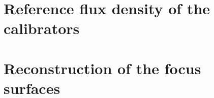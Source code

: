 \documentclass{aa}
\begin{document}
 
\begin{acknowledgements}
     
\end{acknowledgements}

%
%

\begin{appendix}
  \section{Reference flux density of the calibrators}
  \label{se:ref_flux_calibrator}
  
  
  \section{Reconstruction of the focus surfaces}
  \label{sec:focus_surfaces}
    
\end{appendix}
%
%
\end{document}
